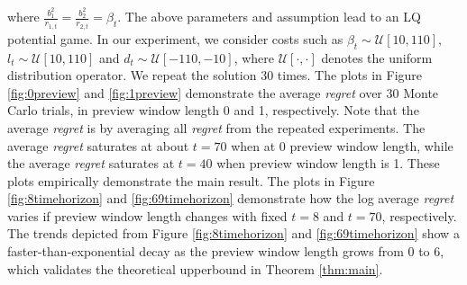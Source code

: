 \documentclass[letterpaper, 10 pt, conference]{ieeeconf}  %
\begin{document}
where $\frac{b_{1}^{2}}{r_{1,t}}=\frac{b_{2}^{2}}{r_{2,t}} = \beta_{t}$. The above parameters and assumption lead to an LQ potential game. In our experiment, we consider costs such as $\beta_{t} \sim \mathcal{U}[10,110]$, $l_{t} \sim \mathcal{U}[10,110]$ and $d_{t}\sim \mathcal{U}[-110,-10]$, where $\mathcal{U}[\cdot,\cdot]$ denotes the uniform distribution operator. We repeat the solution 30 times. The plots in Figure \ref{fig:0preview} and \ref{fig:1preview} demonstrate the average \emph{regret} over 30 Monte Carlo trials, in preview window length 0 and 1, respectively. Note that the average \emph{regret} is by averaging all \emph{regret} from the repeated experiments. The average \emph{regret} saturates at about $t=70$ when at 0 preview window length, while the average \emph{regret} saturates at $t = 40$ when preview window length is 1. These plots empirically demonstrate the main result. The plots in Figure \ref{fig:8timehorizon} and \ref{fig:69timehorizon} demonstrate how the log average \emph{regret} varies if preview window length changes with fixed $t=8$ and $t=70$, respectively. The trends depicted from Figure \ref{fig:8timehorizon} and \ref{fig:69timehorizon} show a faster-than-exponential decay as the preview window length grows from 0 to 6, which validates the theoretical upperbound in Theorem \ref{thm:main}.
\end{document}
